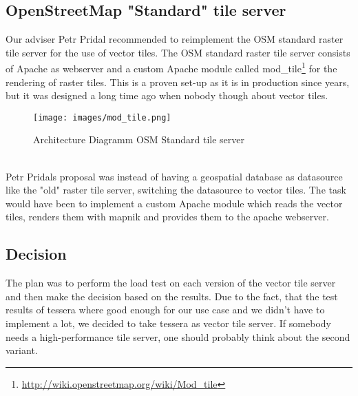 \subsection{OpenStreetMap "Standard" tile server}\label{osm_standard_tile_server}
Our adviser Petr Pridal recommended to reimplement the OSM standard raster tile server for the use of vector tiles. The OSM standard raster tile server consists of Apache as webserver and a custom Apache module called mod\_tile\footnote{\url{http://wiki.openstreetmap.org/wiki/Mod_tile}} for the rendering of raster tiles. This is a proven set-up as it is in production since years, but it was designed a long time ago when nobody though about vector tiles.
\begin{figure}[H]
  \texttt{[image: images/mod\_tile.png]}
  \caption{Architecture Diagramm OSM Standard tile server}
\end{figure} \\
Petr Pridals proposal was instead of having a geospatial database as datasource like the "old" raster tile server, switching the datasource to vector tiles. The task would have been to implement a custom Apache module which reads the vector tiles, renders them with mapnik and provides them to the apache webserver.

\subsection{Decision}\label{tile_server_decision}
The plan was to perform the load test on each version of the vector tile server and then make the decision based on the results. Due to the fact, that the test results of tessera where good enough for our use case and we didn't have to implement a lot, we decided to take tessera as vector tile server.
If somebody needs a high-performance tile server, one should probably think about the second variant.
